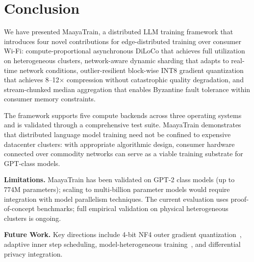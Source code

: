\documentclass[10pt,conference]{IEEEtran}
\begin{document}
\section{Conclusion}
\label{sec:conclusion}

We have presented MaayaTrain, a distributed LLM training framework that
introduces four novel contributions for edge-distributed training over
consumer Wi-Fi: compute-proportional asynchronous DiLoCo that achieves full
utilization on heterogeneous clusters, network-aware dynamic sharding that
adapts to real-time network conditions, outlier-resilient block-wise INT8
gradient quantization that achieves 8--12$\times$ compression without
catastrophic quality degradation, and stream-chunked median aggregation that
enables Byzantine fault tolerance within consumer memory constraints.

The framework supports five compute backends across three operating systems
and is validated through a comprehensive test suite. MaayaTrain demonstrates
that distributed language model training need not be confined to expensive
datacenter clusters: with appropriate algorithmic design, consumer hardware
connected over commodity networks can serve as a viable training substrate
for GPT-class models.

\textbf{Limitations.} MaayaTrain has been validated on GPT-2 class models
(up to 774M parameters); scaling to multi-billion parameter models would
require integration with model parallelism techniques. The current
evaluation uses proof-of-concept benchmarks; full empirical validation on physical
heterogeneous clusters is ongoing.

\textbf{Future Work.} Key directions include 4-bit NF4 outer gradient
quantization~\cite{dettmers2023qlora,douillard2025streaming}, adaptive inner
step scheduling, model-heterogeneous training~\cite{zhu2024heterogeneous},
and differential privacy integration.




\end{document}
